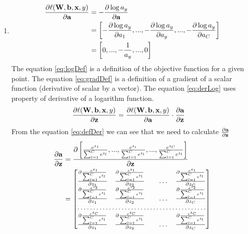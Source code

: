\documentclass[10pt,a4paper]{article}
\begin{document}
\begin{enumerate}
\item 
\begin{align}
\frac{\partial \ell (\textbf{\text{{W}}}, \textbf{\text{{b}}}, \textbf{\text{{x}}}, y)}{\partial \textbf{\text{{a}}}} 
&= -\frac{\partial \log a_y}{\partial \textbf{\text{{a}}}} \label{eq:logDef}\\
&= \left[ -\frac{\partial \log a_y}{\partial a_1}, ..., -\frac{\partial \log a_y}{\partial a_y}, ..., -\frac{\partial \log a_y}{\partial a_C}  \right] \label{eq:gradDef}\\
&= \left[0, ..., -\frac{1}{a_y}, ..., 0\right] \label{eq:derLog}
\end{align}
The equation \ref{eq:logDef} is a definition of the objective function for a given point. The equation \ref{eq:gradDef} is a definition of a gradient of a scalar function (derivative of scalar by a vector). The equation \ref{eq:derLog} uses property of derivative of a logarithm function.
\begin{align}
\frac{\partial \ell (\textbf{\text{{W}}}, \textbf{\text{{b}}}, \textbf{\text{{x}}}, y)}{\partial \textbf{\text{{z}}}} 
&=\frac{\partial \ell (\textbf{\text{{W}}}, \textbf{\text{{b}}}, \textbf{\text{{x}}}, y)}{\partial \textbf{\text{{a}}}}
\cdot \frac{\partial \textbf{\text{{a}}}}{\partial \textbf{\text{{z}}}}   \label{eq:defDer}
\end{align}
From the equation \ref{eq:defDer} we can see that we need to calculate $\frac{\partial\textbf{\text{{a}}}}{\partial\textbf{\text{{z}}}}$
\begin{align}
\frac{\partial \vect{a}}{\partial \vect{z}} 
&=\frac{\partial \left[ \frac{ e^{z_{1}}}{\sum_{l=1}^{C}e^{z_{l}}}, ..., \frac{ e^{z_{i}}}{\sum_{l=1}^{C}e^{z_{l}}},..., \frac{ e^{z_{C}}}{\sum_{l=1}^{C}e^{z_{l}}} \right]}{\partial \vect{z}}  \label{eq:softMax}\\
&=\begin{bmatrix}
    \frac{\partial \frac{ e^{z_{1}}}{\sum_{l=1}^{C}e^{z_{l}}}}{\partial z_1}     & 
    \frac{\partial \frac{ e^{z_{1}}}{\sum_{l=1}^{C}e^{z_{l}}}}{\partial z_2}     &  & \dots & \frac{\partial \frac{ e^{z_{1}}}{\sum_{l=1}^{C}e^{z_{l}}}}{\partial z_C} \\
    \frac{\partial \frac{ e^{z_{2}}}{\sum_{l=1}^{C}e^{z_{l}}}}{\partial z_1}     & 
    \frac{\partial \frac{ e^{z_{2}}}{\sum_{l=1}^{C}e^{z_{l}}}}{\partial z_2}     &  & \dots & \frac{\partial \frac{ e^{z_{2}}}{\sum_{l=1}^{C}e^{z_{l}}}}{\partial z_C} \\
    \hdotsfor{5} \\
    \frac{\partial \frac{ e^{z_{C}}}{\sum_{l=1}^{C}e^{z_{l}}}}{\partial z_1}     & 
    \frac{\partial \frac{ e^{z_{C}}}{\sum_{l=1}^{C}e^{z_{l}}}}{\partial z_2}     &  & \dots & \frac{\partial \frac{ e^{z_{C}}}{\sum_{l=1}^{C}e^{z_{l}}}}{\partial z_C} \\

\end{bmatrix}
\end{align}
\end{enumerate}
\end{document}
